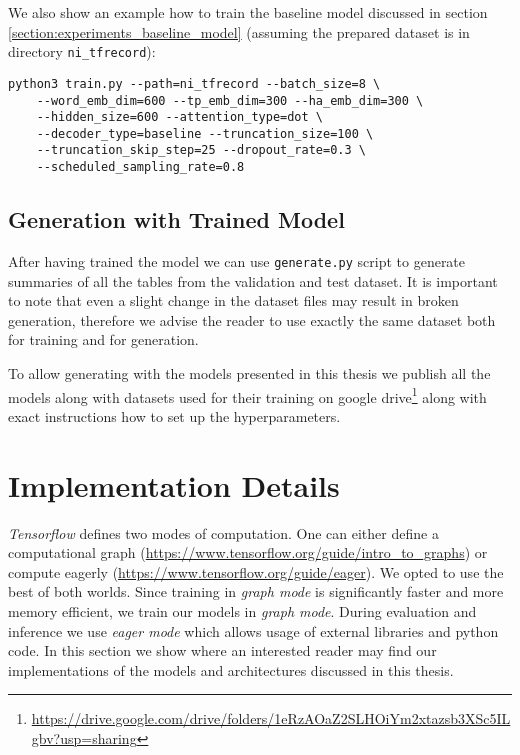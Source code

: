 We also show an example how to train the baseline model discussed in section \ref{section:experiments_baseline_model} (assuming the prepared dataset is in directory \texttt{ni\_tfrecord}):

\begin{verbatim}
python3 train.py --path=ni_tfrecord --batch_size=8 \
    --word_emb_dim=600 --tp_emb_dim=300 --ha_emb_dim=300 \
    --hidden_size=600 --attention_type=dot \
    --decoder_type=baseline --truncation_size=100 \
    --truncation_skip_step=25 --dropout_rate=0.3 \
    --scheduled_sampling_rate=0.8
\end{verbatim}

\subsection{Generation with Trained Model}

After having trained the model we can use \texttt{generate.py} script to generate summaries of all the tables from the validation and test dataset. It is important to note that even a slight change in the dataset files may result in broken generation, therefore we advise the reader to use exactly the same dataset both for training and for generation.

To allow generating with the models presented in this thesis we publish all the models along with datasets used for their training on google drive\footnote{\url{https://drive.google.com/drive/folders/1eRzAOaZ2SLHOiYm2xtazsb3XSc5ILgbv?usp=sharing}} along with exact instructions how to set up the hyperparameters.

\section{Implementation Details}

\emph{Tensorflow} defines two modes of computation. One can either define a computational graph (\url{https://www.tensorflow.org/guide/intro_to_graphs}) or compute eagerly (\url{https://www.tensorflow.org/guide/eager}). We opted to use the best of both worlds. Since training in \emph{graph mode} is significantly faster and more memory efficient, we train our models in \emph{graph mode}. During evaluation and inference we use \emph{eager mode} which allows usage of external libraries and python code. In this section we show where an interested reader may find our implementations of the models and architectures discussed in this thesis.

